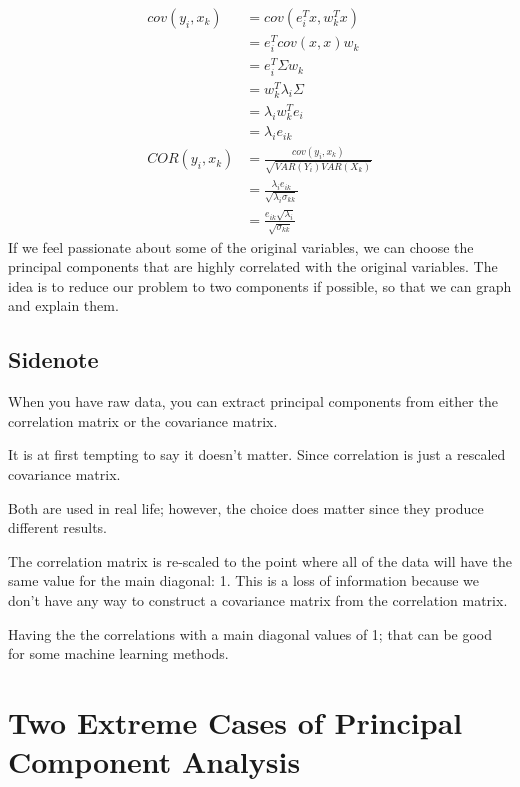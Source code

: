 \begin{align*}
    cov(y_i,x_k) &= cov(e_i^T x,w_k^T x)\\
    &= e_i^T cov(x,x) w_k\\
    &= e_i^T \Sigma w_k\\
    &= w_k^T\lambda_i \Sigma \\
    &= \lambda_i w_k^Te_{i}\\
    &= \lambda_i e_{ik}\\
    COR(y_i,x_k) &= \frac{cov(y_i,x_k)}{\sqrt{VAR(Y_i)VAR(X_k)}}\\
    &= \frac{\lambda_i e_{ik}}{\sqrt{\lambda_i \sigma_{kk}}}\\
    &= \frac{e_{ik} \sqrt{\lambda_i}}{\sqrt{ \sigma_{kk}}}
\end{align*}
If we feel passionate about some of the original variables, we can choose the principal components that are highly correlated with the original variables. The idea is to reduce our problem to two components if possible, so that we can graph and explain them.

\subsection{Sidenote}

When you have raw data, you can extract principal components from either the correlation matrix or the covariance matrix.

It is at first tempting to say it doesn't matter. Since correlation is just a rescaled covariance matrix.

Both are used in real life; however, the choice does matter since they produce different results.

The correlation matrix is re-scaled to the point where all of the data will have the same value for the main diagonal: 1. This is a loss of information because we don't have any way to construct a covariance matrix from the correlation matrix.

Having the the correlations with a main diagonal values of 1; that can be good for some machine learning methods.

\section{Two Extreme Cases of Principal Component Analysis}
